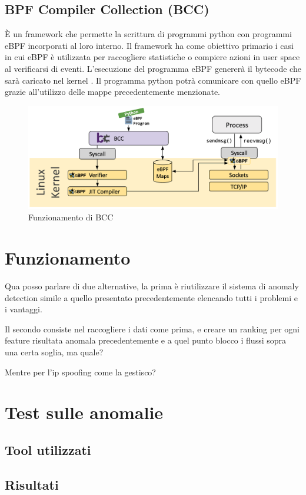 \subsection{BPF Compiler Collection (BCC)}
 
È un framework che permette la scrittura di programmi python con programmi eBPF incorporati al loro interno. Il framework ha come obiettivo primario i casi in cui eBPF è utilizzata per raccogliere statistiche o compiere azioni in user space al verificarsi di eventi. L'esecuzione del programma eBPF genererà il bytecode che sarà caricato nel kernel \cite{ebpf.io}.
Il programma python potrà comunicare con quello eBPF grazie all'utilizzo delle mappe precedentemente menzionate.

\begin{figure}[]
    \label{fig:bcc}
    \includegraphics[width=\hsize]{images/mitigazione/bcc.png}
    \caption{Funzionamento di BCC \cite{ebpf.io}}
    \centering
\end{figure}

\section{Funzionamento}

Qua posso parlare di due alternative, la prima è riutilizzare il sistema di anomaly detection simile a quello presentato precedentemente elencando tutti i problemi e i vantaggi.


Il secondo consiste nel raccogliere i dati come prima, e creare un ranking per ogni feature risultata anomala precedentemente e a quel punto blocco i flussi sopra una certa soglia, ma quale?

Mentre per l'ip spoofing come la gestisco?

\section{Test sulle anomalie}
\subsection{Tool utilizzati}
\subsection{Risultati}
